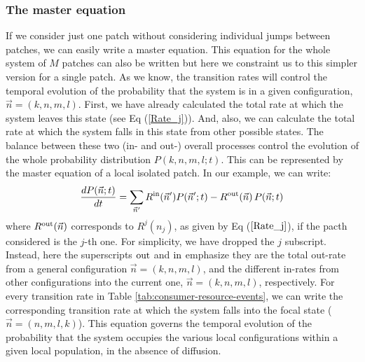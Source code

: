 \subsubsection*{The master equation}
If we consider just one patch without considering individual jumps between patches, we can easily write a master equation. This equation for the whole system of $M$ patches can also be written but here we constraint us to this simpler version for a single patch. As we know, the transition rates will control the temporal evolution of the probability that the system is in a given configuration, $\vec{n}=(k,n,m,l)$. First, we have already calculated the total rate at which the system leaves this state (see Eq (\ref{Rate_j})). And, also, we can calculate the total rate at which the system falls in this state from other possible states. The balance between these two (in- and out-) overall processes control the evolution of the whole probability distribution $P(k,n,m,l; t)$. This can be represented by the master equation of a local isolated patch. In our example, we can write: 
\begin{equation}
	\frac{dP(\vec{n}; t)}{dt} = \sum_{\vec{n}'} R^{\textup{in}}(\vec{n}')P(\vec{n}';t) - R^{\textup{out}}(\vec{n})\,P(\vec{n}; t)
	\label{eq:ME}
\end{equation} 
where $R^{\textup{out}}(\vec{n})$ corresponds to $R^j(n_j)$, as given by Eq ($\ref{Rate_j}$), if the pacth considered is the $j$-th one. For simplicity, we have dropped the $j$ subscript. Instead, here the superscripts $\textup{out}$ and $\textup{in}$  emphasize they are the total out-rate from a general configuration $\vec{n}=(k,n,m,l)$, and the different in-rates from other configurations into the current one, $\vec{n}=(k,n,m,l)$, respectively. For every  transition rate in Table \ref{tab:consumer-resource-events}, we can write the corresponding transition rate at which the system falls into the focal state ($\vec{n}=(n,m,l,k)$). This equation governs the temporal evolution of the probability that the system occupies the various local configurations within a given local population, in the absence of diffusion.

